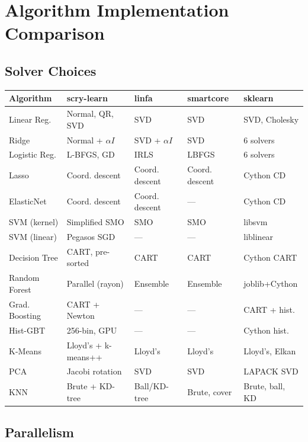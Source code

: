 \documentclass[11pt,a4paper]{article}
\begin{document}
\section{Algorithm Implementation Comparison}

\subsection{Solver Choices}

{\small
\begin{center}
\begin{tabular}{lllll}
\toprule
\textbf{Algorithm} & \textbf{scry-learn} & \textbf{linfa} & \textbf{smartcore} & \textbf{sklearn} \\
\midrule
Linear Reg. & Normal, QR, SVD & SVD & SVD & SVD, Cholesky \\
Ridge & Normal + $\alpha I$ & SVD + $\alpha I$ & SVD & 6 solvers \\
Logistic Reg. & L-BFGS, GD & IRLS & LBFGS & 6 solvers \\
Lasso & Coord. descent & Coord. descent & Coord. descent & Cython CD \\
ElasticNet & Coord. descent & Coord. descent & --- & Cython CD \\
SVM (kernel) & Simplified SMO & SMO & SMO & libsvm \\
SVM (linear) & Pegasos SGD & --- & --- & liblinear \\
Decision Tree & CART, pre-sorted & CART & CART & Cython CART \\
Random Forest & Parallel (rayon) & Ensemble & Ensemble & joblib+Cython \\
Grad. Boosting & CART + Newton & --- & --- & CART + hist. \\
Hist-GBT & 256-bin, GPU & --- & --- & Cython hist. \\
K-Means & Lloyd's + k-means++ & Lloyd's & Lloyd's & Lloyd's, Elkan \\
PCA & Jacobi rotation & SVD & SVD & LAPACK SVD \\
KNN & Brute + KD-tree & Ball/KD-tree & Brute, cover & Brute, ball, KD \\
\bottomrule
\end{tabular}
\end{center}
}

\subsection{Parallelism}
\end{document}
